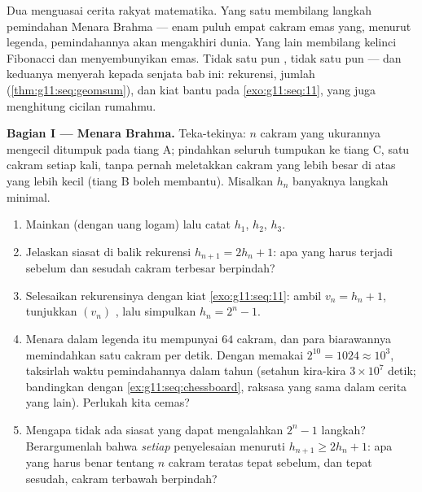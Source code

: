 \begin{problem}
\label{pb:g11:seq:1}
Dua  menguasai cerita rakyat matematika. Yang satu membilang
langkah pemindahan Menara Brahma --- enam puluh empat cakram emas yang,
menurut legenda, pemindahannya akan mengakhiri dunia. Yang lain membilang
kelinci Fibonacci dan menyembunyikan  emas. Tidak satu pun
, tidak satu pun  --- dan keduanya menyerah kepada
senjata bab ini: rekurensi, jumlah 
(\cref{thm:g11:seq:geomsum}), dan kiat  bantu pada
\cref{exo:g11:seq:11}, yang juga menghitung cicilan rumahmu.

\medskip
\noindent\textbf{Bagian I --- Menara Brahma.}
Teka-tekinya: $n$ cakram yang ukurannya mengecil ditumpuk pada tiang A;
pindahkan seluruh tumpukan ke tiang C, satu cakram setiap kali, tanpa pernah
meletakkan cakram yang lebih besar di atas yang lebih kecil (tiang B boleh
membantu). Misalkan $h_n$ banyaknya langkah minimal.
\begin{enumerate}
  \item Mainkan (dengan uang logam) lalu catat $h_1$, $h_2$, $h_3$.
  \item Jelaskan siasat di balik rekurensi
        $h_{n+1} = 2h_n + 1$: apa yang harus terjadi sebelum dan sesudah
        cakram terbesar berpindah?
  \item Selesaikan rekurensinya dengan kiat
        \cref{exo:g11:seq:11}: ambil $v_n = h_n + 1$, tunjukkan
        $(v_n)$ , lalu simpulkan $h_n = 2^n - 1$.
  \item Menara dalam legenda itu mempunyai $64$ cakram, dan para biarawannya
        memindahkan satu cakram per detik. Dengan memakai $2^{10} = 1024 \approx 10^3$,
        taksirlah waktu pemindahannya dalam tahun (setahun kira-kira
        $3 \times 10^7$ detik; bandingkan dengan
        \cref{ex:g11:seq:chessboard}, raksasa yang sama dalam cerita
        yang lain). Perlukah kita cemas?
  \item Mengapa tidak ada siasat yang dapat mengalahkan $2^n - 1$ langkah?
        Berargumenlah bahwa \emph{setiap} penyelesaian menuruti
        $h_{n+1} \geq 2 h_n + 1$: apa yang harus benar tentang $n$ cakram
        teratas tepat sebelum, dan tepat sesudah, cakram terbawah
        berpindah?
\end{enumerate}


\end{problem}

